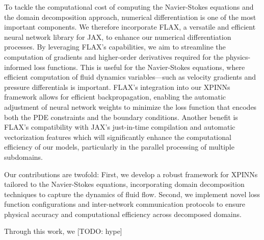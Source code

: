 To tackle the computational cost of computing the Navier-Stokes equations and the domain decomposition approach, numerical differentiation is one of the most important components.
We therefore incorporate FLAX, a versatile and efficient neural network library for JAX, to enhance our numerical differentiation processes.
By leveraging FLAX's capabilities, we aim to streamline the computation of gradients and higher-order derivatives required for the physics-informed loss functions.
This is useful for the Navier-Stokes equations, where efficient computation of fluid dynamics variables—such as velocity gradients and pressure differentials is important.
FLAX's integration into our XPINNs framework allows for efficient backpropagation, enabling the automatic adjustment of neural network weights to minimize the loss function that encodes both the PDE constraints and the boundary conditions.
Another benefit is FLAX's compatibility with JAX's just-in-time compilation and automatic vectorization features which will significantly enhance the computational efficiency of our models, particularly in the parallel processing of multiple subdomains.

Our contributions are twofold:
First, we develop a robust framework for XPINNs tailored to the Navier-Stokes equations, incorporating domain decomposition techniques to capture the dynamics of fluid flow.
Second, we implement novel loss function configurations and inter-network communication protocols to ensure physical accuracy and computational efficiency across decomposed domains.

Through this work, we [TODO: hype]